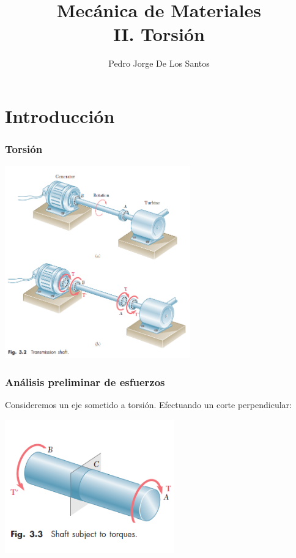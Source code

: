 \documentclass{beamer}
\title{
{\Large Mecánica de Materiales} \\
{\large II. Torsión}
}
\author{Pedro Jorge De Los Santos}
\institute{
    {\bf 
    Instituto Tecnológico de Celaya \\
    Departamento de Ingeniería Mecánica \\
    }
}
\begin{document}
\begin{frame}
\titlepage
\end{frame}

\section{Introducción}

\begin{frame}
\justifying
\frametitle{Torsión}

\begin{center}
\includegraphics[width=0.6\textwidth]{img/flecha_transmision.PNG}
\end{center}

\end{frame}


\begin{frame}
\justifying
\frametitle{Análisis preliminar de esfuerzos}

Consideremos un eje sometido a torsión. Efectuando un corte perpendicular:

\begin{center}
\includegraphics[width=0.55\textwidth]{img/shaft_torque.PNG}
\end{center}

\end{frame}
\end{document}
